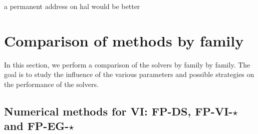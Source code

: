 \begin{ndrva}
 a permanent address on hal  would be better
\end{ndrva}




\newcommand\commentedfigure[1]{}


\makeatletter
\def\subfigcounter{\thesubfigure}
\makeatother



\def\subfiglayout{%
  \captionsetup[subfloat]{farskip=-0pt,captionskip=-2pt,font=scriptsize}%
  \setlength{\abovecaptionskip}{0pt}}
\def\measurename{time}
\def\performance{time}
\def\widthfigure{0.6}
\def\figwidth{0.50\textwidth}
\def\legendwidth{0.6\textwidth}
\def\legendheight{0.15\textheight}

\section{Comparison of methods by family}
\label{Sec:ComparisonFamily}
In this section, we perform a comparison of the solvers by family by family. The goal is  to study the influence of the various parameters and possible strategies on the performance of the solvers.

\subsection{Numerical methods for VI: {\sf FP-DS, FP-VI-$\star$} and {\sf FP-EG-$\star$}}
\label{Sec:Comparison,VI,step-length}


